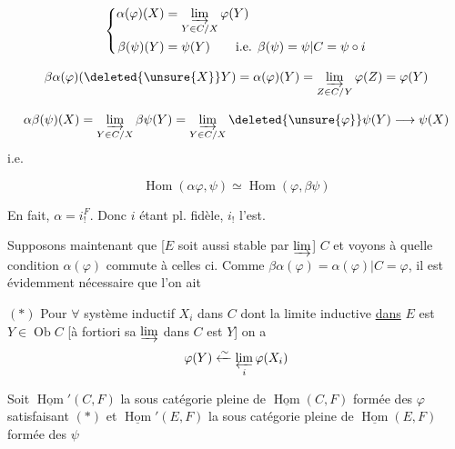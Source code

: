 
\[
\left\{\begin{aligned}\alpha(\varphi)(X)&=\varinjlim_{Y\in C/X}\varphi(Y)\\
\beta(\psi)(Y)&=\psi(Y)\qquad\text{i.e. }\beta(\psi)=\psi|C=\psi\circ i
\end{aligned}\right.
\]

\[\beta\alpha(\varphi)(\deleted{\unsure{X}}Y)=\alpha(\varphi)(Y)=\varinjlim_{Z\in C/Y}\varphi(Z)=\varphi(Y)\]


\[\alpha\beta(\psi)(X)=\varinjlim_{Y\in C/X}\beta\psi(Y)=\varinjlim_{Y\in C/X}\deleted{\unsure{\varphi}}\psi(Y)\longrightarrow\psi(X)\]
i.e.


\[\operatorname{Hom}(\alpha\varphi,\psi)\simeq\operatorname{Hom}(\varphi,\beta\psi)\]

En fait, $\alpha=i_!^F$. Donc $i$ étant pl. fidèle, $i_!$ l'est.

Supposons maintenant que [$E$ soit aussi stable par  $\varinjlim$] $C$  et voyons à quelle condition $\alpha(\varphi)$ commute à celles ci. Comme $\beta\alpha(\varphi)=\alpha(\varphi)|C=\varphi$, il est évidemment nécessaire que l'on ait

$(*)$ Pour $\forall$ système inductif $X_i$ dans $C$ dont la limite inductive \uline{dans} $E$ est  $Y\in\operatorname{Ob}C$ [à fortiori sa $\varinjlim$ dans $C$ est $Y$] on a
\[\varphi(Y)\xleftarrow{\sim}\varprojlim_i\varphi(X_i)\]

Soit $\underline{\operatorname{Hom}}'(C,F)$ la sous catégorie pleine de $\underline{\operatorname{Hom}}(C,F)$ formée des $\varphi$ satisfaisant $(*)$ et $\underline{\operatorname{Hom}}'(E,F)$ la sous catégorie pleine de $\underline{\operatorname{Hom}}(E,F)$ formée des $\psi$

